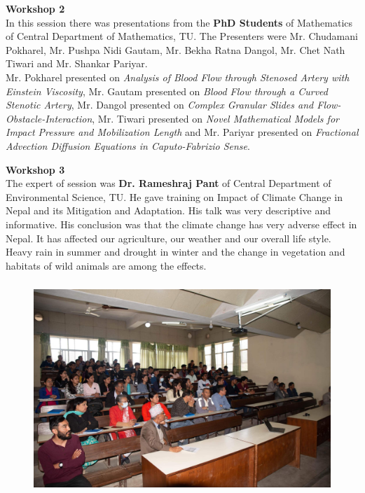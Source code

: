 \documentclass[a4paper,12pt]{report}
\begin{document}
\vspace{5mm}

{\bfseries \large Workshop 2}\\[3mm]
In this session there was presentations from the \textbf{PhD Students} of Mathematics of Central Department of Mathematics, TU. The Presenters were Mr. Chudamani Pokharel, Mr. Pushpa Nidi Gautam, Mr. Bekha Ratna Dangol, Mr. Chet Nath Tiwari and Mr. Shankar Pariyar.\\[3mm]
Mr. Pokharel presented on \textit{Analysis of Blood Flow through Stenosed Artery with Einstein Viscosity}, Mr. Gautam presented on \textit{Blood Flow through a Curved Stenotic Artery}, Mr. Dangol presented on \textit{Complex Granular Slides and Flow-Obstacle-Interaction}, Mr. Tiwari presented on \textit{Novel Mathematical Models for Impact Pressure and Mobilization Length} and Mr. Pariyar presented on \textit{Fractional Advection Diffusion Equations in Caputo-Fabrizio Sense}.
\clearpage

{\bfseries \large Workshop 3}\\[3mm]
The expert of session was \textbf{Dr. Rameshraj Pant} of Central Department of Environmental Science, TU. He gave training on Impact of Climate Change in Nepal and its Mitigation and Adaptation. His talk was very descriptive and informative. His conclusion was that the climate change has very adverse effect in Nepal. It has affected our agriculture, our weather and our overall life style. Heavy rain in summer and drought in winter and the change in vegetation and habitats of wild animals are among the effects.
\vspace{5mm}

\begin{figure}[h!]
  \centering
  \includegraphics[width=13cm, height=8cm]{ss.jpeg}
\end{figure}
\end{document}
